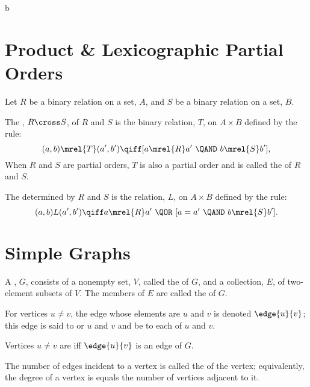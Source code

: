 \documentclass[handout]{mcs}
\begin{document}


b


\appendix

\section{Product \& Lexicographic Partial Orders}

Let $R$ be a binary relation on a set, $A$, and $S$ be a binary
relation on a set, $B$.


The , $R \cross S$, of $R$ and $S$ is the binary
relation, $T$, on $A \times B$ defined by the rule:
\[
(a,b) \mrel{T} (a',b') \qiff [a \mrel{R} a'\ \QAND\ b \mrel{S} b'],
\]
When $R$ and $S$ are partial orders, $T$ is also a partial order and is
called the  of $R$ and $S$.

The  determined by $R$ and
$S$ is the relation, $L$, on $A \times B$ defined by the rule:
\[
(a,b) L (a',b') \qiff
    a \mrel{R} a'\ \QOR\ [a = a'\ \QAND\ b \mrel{S} b'].
\]


\section{Simple Graphs}

A , $G$, consists of a nonempty set, $V$, called the
 of $G$, and a collection, $E$, of two-element subsets of
$V$.  The members of $E$ are called the  of $G$.

For vertices $u \neq v$, the edge whose elements are $u$ and $v$ is denoted
$\edge{u}{v}$; this edge is said to  or  $u$
and $v$ and be  to each of $u$ and $v$.

Vertices $u \neq v$ are  iff $\edge{u}{v}$ is an edge of
$G$.

The number of edges incident to a vertex is called the  of
the vertex; equivalently, the degree of a vertex is equals the number of
vertices adjacent to it.
\end{document}
